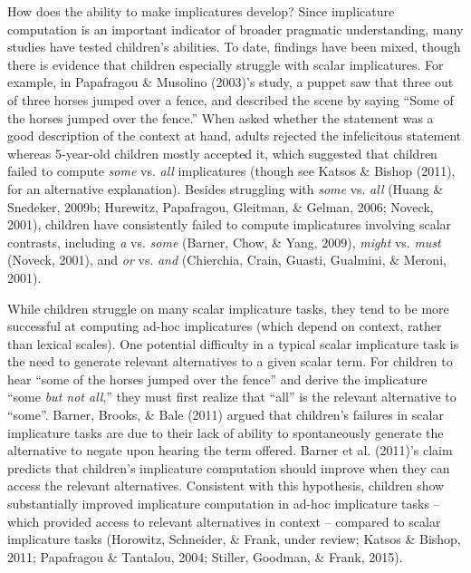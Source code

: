 \documentclass[a4paper,man,apacite,floatsintext]{apa6}
\begin{document}
How does the ability to make implicatures develop? Since implicature
computation is an important indicator of broader pragmatic
understanding, many studies have tested children's abilities. To date,
findings have been mixed, though there is evidence that children
especially struggle with scalar implicatures. For example, in Papafragou
\& Musolino (2003)'s study, a puppet saw that three out of three horses
jumped over a fence, and described the scene by saying ``Some of the
horses jumped over the fence.'' When asked whether the statement was a
good description of the context at hand, adults rejected the
infelicitous statement whereas 5-year-old children mostly accepted it,
which suggested that children failed to compute \emph{some} vs.
\emph{all} implicatures (though see Katsos \& Bishop (2011), for an
alternative explanation). Besides struggling with \emph{some} vs.
\emph{all} (Huang \& Snedeker, 2009b; Hurewitz, Papafragou, Gleitman, \&
Gelman, 2006; Noveck, 2001), children have consistently failed to
compute implicatures involving scalar contrasts, including \emph{a} vs.
\emph{some} (Barner, Chow, \& Yang, 2009), \emph{might} vs. \emph{must}
(Noveck, 2001), and \emph{or} vs. \emph{and} (Chierchia, Crain, Guasti,
Gualmini, \& Meroni, 2001).

While children struggle on many scalar implicature tasks, they tend to
be more successful at computing ad-hoc implicatures (which depend on
context, rather than lexical scales). One potential difficulty in a
typical scalar implicature task is the need to generate relevant
alternatives to a given scalar term. For children to hear ``some of the
horses jumped over the fence'' and derive the implicature ``some
\emph{but not all},'' they must first realize that ``all'' is the
relevant alternative to ``some''. Barner, Brooks, \& Bale (2011) argued
that children's failures in scalar implicature tasks are due to their
lack of ability to spontaneously generate the alternative to negate upon
hearing the term offered. Barner et al. (2011)'s claim predicts that
children's implicature computation should improve when they can access
the relevant alternatives. Consistent with this hypothesis, children
show substantially improved implicature computation in ad-hoc
implicature tasks -- which provided access to relevant alternatives in
context -- compared to scalar implicature tasks (Horowitz, Schneider, \&
Frank, under review; Katsos \& Bishop, 2011; Papafragou \& Tantalou,
2004; Stiller, Goodman, \& Frank, 2015).
\end{document}
